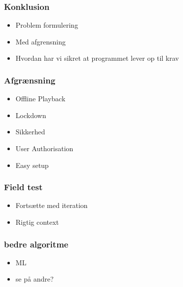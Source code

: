 \begin{frame}
	\frametitle{Konklusion}
	\begin{itemize}
		\item Problem formulering
		\item Med afgrensning
		\item Hvordan har vi sikret at programmet lever op til krav
	\end{itemize}
\end{frame}

\begin{frame}
	\frametitle{Afgrænsning}
	\begin{itemize}
		\item Offline Playback
		\item Lockdown
		\item Sikkerhed
		\item User Authorisation
		\item Easy setup
	\end{itemize}
\end{frame}

\begin{frame}
	\frametitle{Field test}
	\begin{itemize}
		\item Fortsætte med iteration
		\item Rigtig context
	\end{itemize}
\end{frame}

\begin{frame}
	\frametitle{bedre algoritme}
	\begin{itemize}
		\item ML
		\item se på andre?
	\end{itemize}
\end{frame}